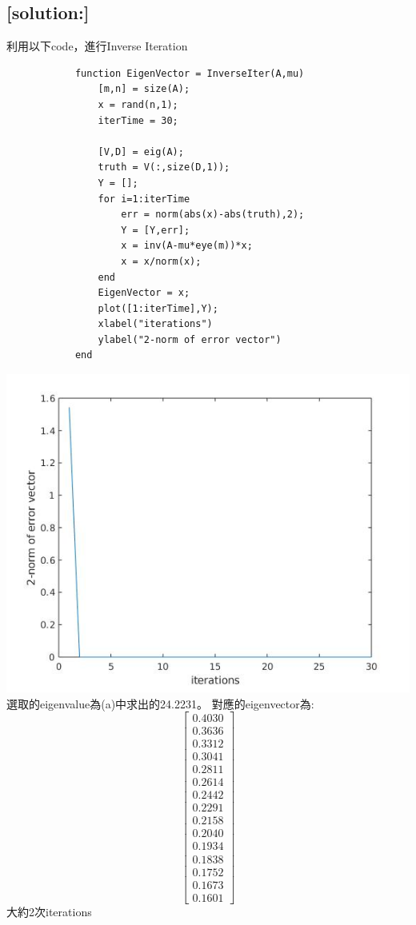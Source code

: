 \documentclass[12pt]{article}
\begin{document}
        \subsection*{[solution:]}
        利用以下code，進行Inverse Iteration
        \begin{lstlisting}
            function EigenVector = InverseIter(A,mu)
                [m,n] = size(A);
                x = rand(n,1);
                iterTime = 30;

                [V,D] = eig(A);
                truth = V(:,size(D,1));
                Y = [];
                for i=1:iterTime
                    err = norm(abs(x)-abs(truth),2);
                    Y = [Y,err];
                    x = inv(A-mu*eye(m))*x;
                    x = x/norm(x);
                end
                EigenVector = x;
                plot([1:iterTime],Y);
                xlabel("iterations")
                ylabel("2-norm of error vector")
            end
        \end{lstlisting}
        \includegraphics[scale=0.75]{inverseIter.jpg}\\
        選取的eigenvalue為(a)中求出的24.2231。
        對應的eigenvector為:
        \[\left[
            \begin{array}{c}
                0.4030\\
                0.3636\\
                0.3312\\
                0.3041\\
                0.2811\\
                0.2614\\
                0.2442\\
                0.2291\\
                0.2158\\
                0.2040\\
                0.1934\\
                0.1838\\
                0.1752\\
                0.1673\\
                0.1601
            \end{array}
        \right]\]
        大約2次iterations
\end{document}
